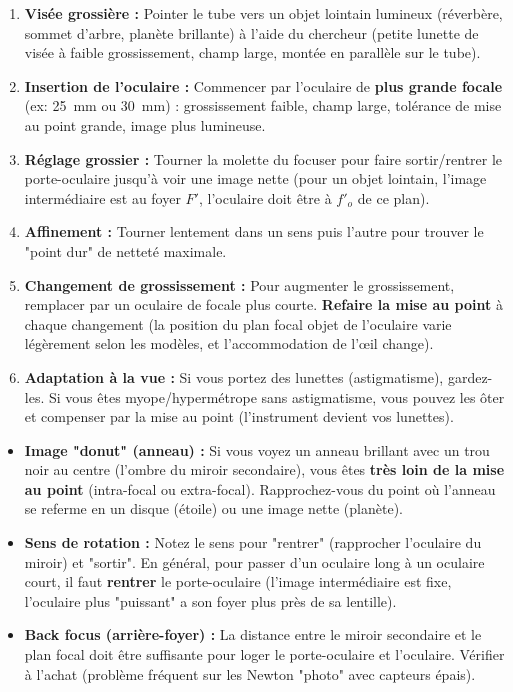 \documentclass[11pt]{article}
\begin{document}
\begin{methode}
\begin{enumerate}
    \item \textbf{Visée grossière :} Pointer le tube vers un objet lointain lumineux (réverbère, sommet d'arbre, planète brillante) à l'aide du chercheur (petite lunette de visée à faible grossissement, champ large, montée en parallèle sur le tube).
    \item \textbf{Insertion de l'oculaire :} Commencer par l'oculaire de \textbf{plus grande focale} (ex: \SI{25}{mm} ou \SI{30}{mm}) : grossissement faible, champ large, tolérance de mise au point grande, image plus lumineuse.
    \item \textbf{Réglage grossier :} Tourner la molette du focuser pour faire sortir/rentrer le porte-oculaire jusqu'à voir une image nette (pour un objet lointain, l'image intermédiaire est au foyer $F'$, l'oculaire doit être à $f'_o$ de ce plan).
    \item \textbf{Affinement :} Tourner lentement dans un sens puis l'autre pour trouver le "point dur" de netteté maximale.
    \item \textbf{Changement de grossissement :} Pour augmenter le grossissement, remplacer par un oculaire de focale plus courte. \textbf{Refaire la mise au point} à chaque changement (la position du plan focal objet de l'oculaire varie légèrement selon les modèles, et l'accommodation de l'œil change).
    \item \textbf{Adaptation à la vue :} Si vous portez des lunettes (astigmatisme), gardez-les. Si vous êtes myope/hypermétrope sans astigmatisme, vous pouvez les ôter et compenser par la mise au point (l'instrument devient vos lunettes).
\end{enumerate}
\end{methode}

\begin{attention}
\begin{itemize}
    \item \textbf{Image "donut" (anneau) :} Si vous voyez un anneau brillant avec un trou noir au centre (l'ombre du miroir secondaire), vous êtes \textbf{très loin de la mise au point} (intra-focal ou extra-focal). Rapprochez-vous du point où l'anneau se referme en un disque (étoile) ou une image nette (planète).
    \item \textbf{Sens de rotation :} Notez le sens pour "rentrer" (rapprocher l'oculaire du miroir) et "sortir". En général, pour passer d'un oculaire long à un oculaire court, il faut \textbf{rentrer} le porte-oculaire (l'image intermédiaire est fixe, l'oculaire plus "puissant" a son foyer plus près de sa lentille).
    \item \textbf{Back focus (arrière-foyer) :} La distance entre le miroir secondaire et le plan focal doit être suffisante pour loger le porte-oculaire et l'oculaire. Vérifier à l'achat (problème fréquent sur les Newton "photo" avec capteurs épais).
\end{itemize}
\end{attention}
\end{document}
